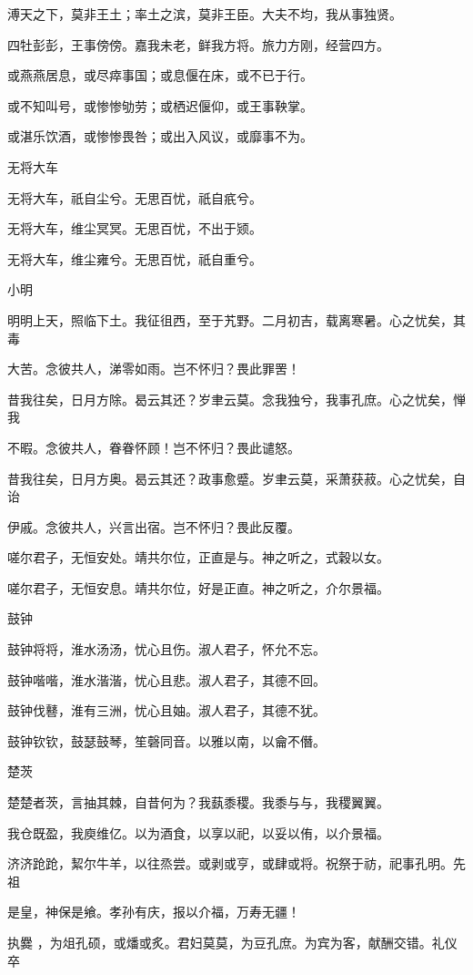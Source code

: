 溥天之下，莫非王土；率土之滨，莫非王臣。大夫不均，我从事独贤。

四牡彭彭，王事傍傍。嘉我未老，鲜我方将。旅力方刚，经营四方。

或燕燕居息，或尽瘁事国；或息偃在床，或不已于行。

或不知叫号，或惨惨劬劳；或栖迟偃仰，或王事鞅掌。

或湛乐饮酒，或惨惨畏咎；或出入风议，或靡事不为。

无将大车

无将大车，祇自尘兮。无思百忧，祇自疧兮。

无将大车，维尘冥冥。无思百忧，不出于颎。

无将大车，维尘雍兮。无思百忧，祇自重兮。

小明

明明上天，照临下土。我征徂西，至于艽野。二月初吉，载离寒暑。心之忧矣，其毒

大苦。念彼共人，涕零如雨。岂不怀归？畏此罪罟！

昔我往矣，日月方除。曷云其还？岁聿云莫。念我独兮，我事孔庶。心之忧矣，惮我

不暇。念彼共人，眷眷怀顾！岂不怀归？畏此谴怒。

昔我往矣，日月方奥。曷云其还？政事愈蹙。岁聿云莫，采萧获菽。心之忧矣，自诒

伊戚。念彼共人，兴言出宿。岂不怀归？畏此反覆。

嗟尔君子，无恒安处。靖共尔位，正直是与。神之听之，式穀以女。

嗟尔君子，无恒安息。靖共尔位，好是正直。神之听之，介尔景福。

鼓钟

鼓钟将将，淮水汤汤，忧心且伤。淑人君子，怀允不忘。

鼓钟喈喈，淮水湝湝，忧心且悲。淑人君子，其德不回。

鼓钟伐鼛，淮有三洲，忧心且妯。淑人君子，其德不犹。

鼓钟钦钦，鼓瑟鼓琴，笙磬同音。以雅以南，以龠不僭。

楚茨

楚楚者茨，言抽其棘，自昔何为？我蓺黍稷。我黍与与，我稷翼翼。

我仓既盈，我庾维亿。以为酒食，以享以祀，以妥以侑，以介景福。

济济跄跄，絜尔牛羊，以往烝尝。或剥或亨，或肆或将。祝祭于祊，祀事孔明。先祖

是皇，神保是飨。孝孙有庆，报以介福，万寿无疆！

执爨 ，为俎孔硕，或燔或炙。君妇莫莫，为豆孔庶。为宾为客，献酬交错。礼仪卒

